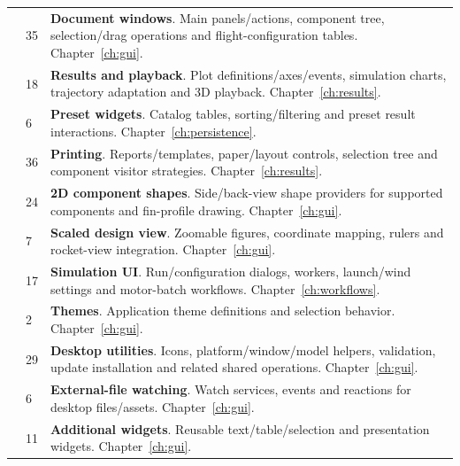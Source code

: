 \begin{longtable}{@{}L{4.6cm}L{0.8cm}L{10.2cm}@{}}
 & 35 & \textbf{Document windows}. Main panels/actions, component tree, selection/drag operations and flight-configuration tables. Chapter~\ref{ch:gui}.\\

 & 18 & \textbf{Results and playback}. Plot definitions/axes/events, simulation charts, trajectory adaptation and 3D playback. Chapter~\ref{ch:results}.\\

 & 6 & \textbf{Preset widgets}. Catalog tables, sorting/filtering and preset result interactions. Chapter~\ref{ch:persistence}.\\

 & 36 & \textbf{Printing}. Reports/templates, paper/layout controls, selection tree and component visitor strategies. Chapter~\ref{ch:results}.\\

 & 24 & \textbf{2D component shapes}. Side/back-view shape providers for supported components and fin-profile drawing. Chapter~\ref{ch:gui}.\\

 & 7 & \textbf{Scaled design view}. Zoomable figures, coordinate mapping, rulers and rocket-view integration. Chapter~\ref{ch:gui}.\\

 & 17 & \textbf{Simulation UI}. Run/configuration dialogs, workers, launch/wind settings and motor-batch workflows. Chapter~\ref{ch:workflows}.\\

 & 2 & \textbf{Themes}. Application theme definitions and selection behavior. Chapter~\ref{ch:gui}.\\

 & 29 & \textbf{Desktop utilities}. Icons, platform/window/model helpers, validation, update installation and related shared operations. Chapter~\ref{ch:gui}.\\

 & 6 & \textbf{External-file watching}. Watch services, events and reactions for desktop files/assets. Chapter~\ref{ch:gui}.\\

 & 11 & \textbf{Additional widgets}. Reusable text/table/selection and presentation widgets. Chapter~\ref{ch:gui}.\\


\end{longtable}
